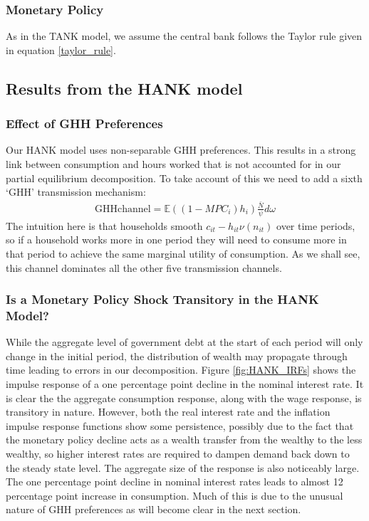 \documentclass[titlepage]{\econtex}\newcommand{\texname}{ConsumptionHeterogeneity}
\begin{document}
\subsubsection{Monetary Policy}
As in the TANK model, we assume the central bank follows the Taylor rule given in equation \ref{taylor_rule}.

\subsection{Results from the HANK model}
\subsubsection{Effect of GHH Preferences}
Our HANK model uses non-separable GHH preferences. This results in a strong link between consumption and hours worked that is not accounted for in our partial equilibrium decomposition. To take account of this we need to add a sixth `GHH' transmission mechanism:
\begin{align*}
\text{GHHchannel} = \mathbb{E}\left((1-MPC_i) h_i\right)  \frac{\bar{N}}{\psi} d\omega
\end{align*}
The intuition here is that households smooth $c_{it} - h_{it}\nu(n_{it})$ over time periods, so if a household works more in one period they will need to consume more in that period to achieve the same marginal utility of consumption. As we shall see, this channel dominates all the other five transmission channels.

\subsubsection{Is a Monetary Policy Shock Transitory in the HANK Model?}
While the aggregate level of government debt at the start of each period will only change in the initial period, the distribution of wealth may propagate through time leading to errors in our decomposition. Figure \ref{fig:HANK_IRFs} shows the impulse response of a one percentage point decline in the nominal interest rate. It is clear the the aggregate consumption response, along with the wage response, is transitory in nature. However, both the real interest rate and the inflation impulse response functions show some persistence, possibly due to the fact that the monetary policy decline acts as a wealth transfer from the wealthy to the less wealthy, so higher interest rates are required to dampen demand back down to the steady state level. The aggregate size of the response is also noticeably large. The one percentage point decline in nominal interest rates leads to almost 12 percentage point increase in consumption. Much of this is due to the unusual nature of GHH preferences as will become clear in the next section.
\end{document}
